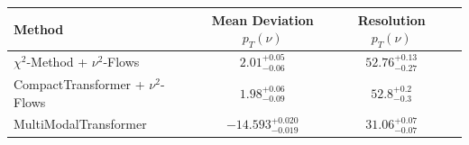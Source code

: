     \begin{tabular}{lccc}
        \toprule
        Method & Mean Deviation $p_{T}({\nu})$ & Resolution $p_{T}({\nu})$ \\
        \midrule
        $\chi^2$-Method + $\nu^2$-Flows & $2.01^{+0.05}_{-0.06}$ & $52.76^{+0.13}_{-0.27}$ \\
        CompactTransformer + $\nu^2$-Flows & $1.98^{+0.06}_{-0.09}$ & $52.8^{+0.2}_{-0.3}$ \\
        MultiModalTransformer & $-14.593^{+0.020}_{-0.019}$ & $31.06^{+0.07}_{-0.07}$ \\
        \bottomrule
    \end{tabular}